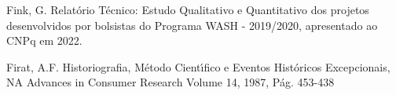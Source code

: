 \documentclass[
12pt,		%
openright,	%
twoside,  %
a4paper,			%
chapter=TITLE,		%
english,			%
french,				%
spanish,			%
brazil				%
]{USPSC-classe/USPSC}
\begin{document}
\begin{flushleft}
\begin{flushleft}
\begin{flushleft}
\begin{flushleft}
\begin{flushleft}
\begin{flushleft}
\begin{flushleft}
\begin{flushleft}
\begin{flushleft}
[FINK, 2022] Fink, G. Relat\'orio T\'ecnico: Estudo Qualitativo e Quantitativo dos projetos desenvolvidos por bolsistas do Programa WASH - 2019/2020, apresentado ao CNPq em 2022.
\end{flushleft}


\end{flushleft}


\end{flushleft}


\end{flushleft}


\end{flushleft}


\end{flushleft}


\end{flushleft}


\end{flushleft}


\end{flushleft}


\begin{flushleft}
\begin{flushleft}
\begin{flushleft}
\begin{flushleft}
\begin{flushleft}
\begin{flushleft}
\begin{flushleft}
\begin{flushleft}
\begin{flushleft}
[FIRAT, 1987] Firat, A.F. Historiografia, M\'etodo Cient\'{\i}fico e Eventos Hist\'oricos Excepcionais, NA Advances in Consumer Research Volume 14, 1987, P\'ag. 453-438
\end{flushleft}


\end{flushleft}


\end{flushleft}


\end{flushleft}


\end{flushleft}


\end{flushleft}


\end{flushleft}


\end{flushleft}


\end{flushleft}
\end{document}
